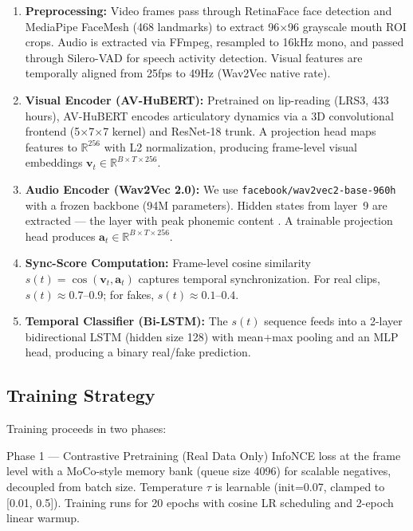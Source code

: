 \documentclass[12pt, letterpaper]{article}
\begin{document}
\begin{enumerate}[leftmargin=1.5em, itemsep=2pt]
    \item \textbf{Preprocessing:} Video frames pass through RetinaFace face detection and MediaPipe FaceMesh (468 landmarks) to extract 96$\times$96 grayscale mouth ROI crops. Audio is extracted via FFmpeg, resampled to 16kHz mono, and passed through Silero-VAD for speech activity detection. Visual features are temporally aligned from 25fps to 49Hz (Wav2Vec native rate).

    \item \textbf{Visual Encoder (AV-HuBERT):} Pretrained on lip-reading (LRS3, 433 hours), AV-HuBERT encodes articulatory dynamics via a 3D convolutional frontend (5$\times$7$\times$7 kernel) and ResNet-18 trunk. A projection head maps features to $\mathbb{R}^{256}$ with L2 normalization, producing frame-level visual embeddings $\mathbf{v}_t \in \mathbb{R}^{B \times T \times 256}$.

    \item \textbf{Audio Encoder (Wav2Vec 2.0):} We use \texttt{facebook/wav2vec2-base-960h} with a frozen backbone (94M parameters). Hidden states from layer~9 are extracted — the layer with peak phonemic content \cite{pasad2021}. A trainable projection head produces $\mathbf{a}_t \in \mathbb{R}^{B \times T \times 256}$.

    \item \textbf{Sync-Score Computation:} Frame-level cosine similarity $s(t) = \cos(\mathbf{v}_t, \mathbf{a}_t)$ captures temporal synchronization. For real clips, $s(t) \approx 0.7$--$0.9$; for fakes, $s(t) \approx 0.1$--$0.4$.

    \item \textbf{Temporal Classifier (Bi-LSTM):} The $s(t)$ sequence feeds into a 2-layer bidirectional LSTM (hidden size 128) with mean+max pooling and an MLP head, producing a binary real/fake prediction.
\end{enumerate}

\subsection{Training Strategy}

Training proceeds in two phases:

\begin{infobox}{Phase 1 — Contrastive Pretraining (Real Data Only)}
InfoNCE loss at the frame level with a MoCo-style memory bank (queue size 4096) for scalable negatives, decoupled from batch size. Temperature $\tau$ is learnable (init=0.07, clamped to [0.01, 0.5]). Training runs for 20 epochs with cosine LR scheduling and 2-epoch linear warmup.
\end{infobox}
\end{document}
